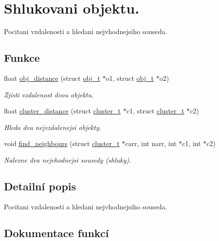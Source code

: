 \hypertarget{group__Shlukovani}{}\section{Shlukovani objektu.}
\label{group__Shlukovani}


Pocitani vzdalenosti a hledani nejvhodnejsiho souseda.  


\subsection*{Funkce}
\begin{DoxyCompactItemize}
\item 
float \hyperlink{group__Shlukovani_ga703ce6afddf65026b68645bc5394405b}{obj\+\_\+distance} (struct \hyperlink{structobj__t}{obj\+\_\+t} $\ast$o1, struct \hyperlink{structobj__t}{obj\+\_\+t} $\ast$o2)
\begin{DoxyCompactList}\small\item\em Zjisti vzdalenost dvou objektu. \end{DoxyCompactList}\item 
float \hyperlink{group__Shlukovani_gaf336f28a62c28da792f6def84f432bb2}{cluster\+\_\+distance} (struct \hyperlink{structcluster__t}{cluster\+\_\+t} $\ast$c1, struct \hyperlink{structcluster__t}{cluster\+\_\+t} $\ast$c2)
\begin{DoxyCompactList}\small\item\em Hleda dva nejvzdalenejsi objekty. \end{DoxyCompactList}\item 
void \hyperlink{group__Shlukovani_ga5f16d682e7c859f7bd3f27697c2b7cc0}{find\+\_\+neighbours} (struct \hyperlink{structcluster__t}{cluster\+\_\+t} $\ast$carr, int narr, int $\ast$c1, int $\ast$c2)
\begin{DoxyCompactList}\small\item\em Nalezne dva nejvhodnejsi sousedy (shluky). \end{DoxyCompactList}\end{DoxyCompactItemize}


\subsection{Detailní popis}
Pocitani vzdalenosti a hledani nejvhodnejsiho souseda. 



\subsection{Dokumentace funkcí}
